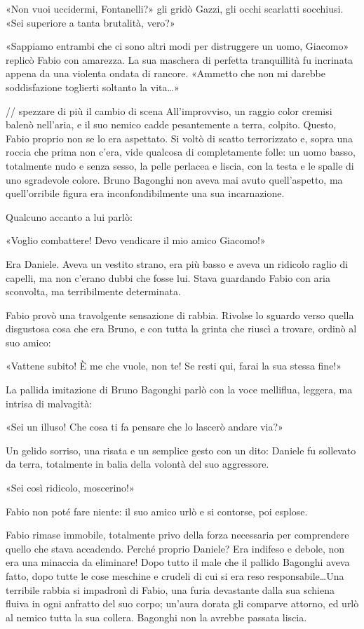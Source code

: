 «Non vuoi uccidermi, Fontanelli?» gli gridò Gazzi, gli occhi scarlatti socchiusi. «Sei superiore a tanta brutalità, vero?»

«Sappiamo entrambi che ci sono altri modi per distruggere un uomo, Giacomo» replicò Fabio con amarezza. La sua maschera di perfetta tranquillità fu incrinata appena da una violenta ondata di rancore. «Ammetto che non mi darebbe soddisfazione toglierti soltanto la vita\ldots»

// spezzare di più il cambio di scena
All'improvviso, un raggio color cremisi balenò nell'aria, e il suo nemico cadde pesantemente a terra, colpito. Questo, Fabio proprio non se lo era aspettato. Si voltò di scatto terrorizzato e, sopra una roccia che prima non c'era, vide qualcosa di completamente folle: un uomo basso, totalmente nudo e senza sesso, la pelle perlacea e liscia, con la testa e le spalle di uno sgradevole colore. Bruno Bagonghi non aveva mai avuto quell'aspetto, ma quell'orribile figura era inconfondibilmente una sua incarnazione.

Qualcuno accanto a lui parlò:

«Voglio combattere! Devo vendicare il mio amico Giacomo!»

Era Daniele. Aveva un vestito strano, era più basso e aveva un ridicolo raglio di capelli, ma non c'erano dubbi che fosse lui. Stava guardando Fabio con aria sconvolta, ma terribilmente determinata.

Fabio provò una travolgente sensazione di rabbia. Rivolse lo sguardo verso quella disgustosa cosa che era Bruno, e con tutta la grinta che riuscì a trovare, ordinò al suo amico:

«Vattene subito! È me che vuole, non te! Se resti qui, farai la sua stessa fine!»

La pallida imitazione di Bruno Bagonghi parlò con la voce melliflua, leggera, ma intrisa di malvagità:

«Sei un illuso! Che cosa ti fa pensare che lo lascerò andare via?»

Un gelido sorriso, una risata e un semplice gesto con un dito: Daniele fu sollevato da terra, totalmente in balia della volontà del suo aggressore.

«Sei così ridicolo, moscerino!»

Fabio non poté fare niente: il suo amico urlò e si contorse, poi esplose.

Fabio rimase immobile, totalmente privo della forza necessaria per comprendere quello che stava accadendo. Perché proprio Daniele? Era indifeso e debole, non era una minaccia da eliminare! Dopo tutto il male che il pallido Bagonghi aveva fatto, dopo tutte le cose meschine e crudeli di cui si era reso responsabile\ldots Una terribile rabbia si impadronì di Fabio, una furia devastante dalla sua schiena fluiva in ogni anfratto del suo corpo; un'aura dorata gli comparve attorno, ed urlò al nemico tutta la sua collera. Bagonghi non la avrebbe passata liscia.

